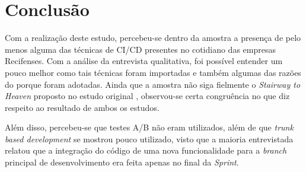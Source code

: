 
\section{Conclusão}

Com a realização deste estudo, percebeu-se dentro da amostra a presença de pelo menos alguma das técnicas de CI/CD presentes no cotidiano das empresas Recifenses. Com a análise da entrevista qualitativa, foi possível entender um pouco melhor como tais técnicas foram importadas e também algumas das razões do porque foram adotadas. Ainda que a amostra não siga fielmente o \emph{Stairway to Heaven} proposto no estudo original \cite{empiricalStudy2016}, observou-se certa congruência no que diz respeito ao resultado de ambos os estudos.

Além disso, percebeu-se que testes A/B não eram utilizados, além de que \emph{trunk based development} se mostrou pouco utilizado, visto que a maioria entrevistada relatou que a integração do código de uma nova funcionalidade para a \emph{branch} principal de desenvolvimento era feita apenas no final da \emph{Sprint}.